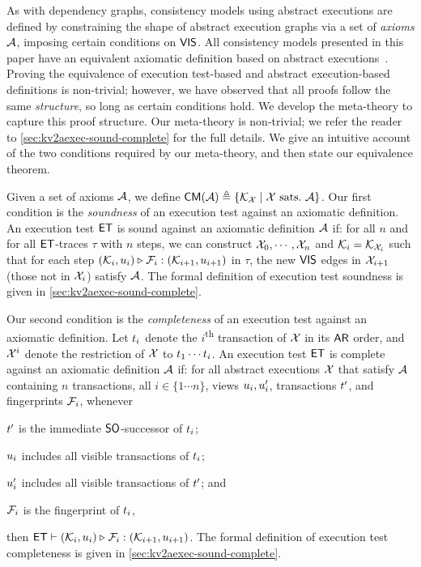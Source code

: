 As with dependency graphs, consistency models using abstract executions are defined by constraining the shape of abstract execution graphs via a set of \emph{axioms} $\mathcal{A}$, \eg imposing certain conditions on $\mathsf{VIS}$. %
All consistency models presented in this paper have an equivalent axiomatic definition based on abstract executions~\cite{framework-concur,laws}. 
Proving the equivalence of execution test-based and abstract execution-based definitions is non-trivial; 
however, we have observed that all proofs follow the same \emph{structure}, so long as certain conditions hold. 
We develop the meta-theory to capture this proof structure.
Our meta-theory is non-trivial; we refer the reader to \cref{sec:kv2aexec-sound-complete} for the full details. 
We give an intuitive account of the two conditions required by our meta-theory, and then state our equivalence theorem. 

Given a set of axioms $\mathcal{A}$, we define $\mathsf{CM}(\mathcal{A}) \triangleq \{\mathcal{K}_{\mathcal{X}} \mid \mathcal{X} \text{ sats.\ } \mathcal{A} \}$.
Our first condition is the \emph{soundness} of an execution test against an axiomatic definition.
An execution test $\mathsf{ET}$ is sound against an axiomatic definition $\mathcal{A}$ if:
for all $n$ and for all \( \mathsf{ET} \)-traces \( \tau \) with \( n \) steps, 
we can construct $\mathcal{X}_0, \cdots, \mathcal{X}_n$ and \( \mathcal{K}_i = \mathcal{K}_{\mathcal{X}_i} \) such that 
for each step \( (\mathcal{K}_i, u_i) \triangleright_{} \mathcal{F}_i : (\mathcal{K}_{i+1}, u_{i+1}) \) in \( \tau \),
the new $\mathsf{VIS}$ edges in \( \mathcal{X}_{i+1} \) (those not in $\mathcal{X}_i$)
satisfy \( \mathcal{A} \).
The formal definition of execution test soundness is given in \cref{sec:kv2aexec-sound-complete}.
%

Our second condition is the \emph{completeness} of an execution test against an axiomatic definition.
Let $t_i$ denote the $i$\textsuperscript{th} transaction of $\mathcal{X}$ in its $\mathsf{AR}$ order, and $\mathcal{X}^{i}$ denote the restriction of $\mathcal{X}$ to $t_1 \cdots t_i$. 
An execution test $\mathsf{ET}$ is complete against an axiomatic definition $\mathcal{A}$ if:
for all abstract executions \( \mathcal{X} \) that satisfy \( \mathcal{A} \) containing $n$ transactions, 
all $i \in \{1 \cdots n\}$, views $u_i, u'_i$, transactions $t'$, and fingerprints $\mathcal{F}_i$,
whenever
\begin{enumerate*}
	\item $t'$ is the immediate $\mathsf{SO}$-successor of $t_i$;
	\item \( u_i \) includes all visible transactions of \( t_i \); 
	\item $u'_i$ includes all visible transactions of $t'$; and
	\item $\mathcal{F}_i$ is the fingerprint of $t_i$, 
\end{enumerate*} 
then $\mathsf{ET} \vdash (\mathcal{K}_i, u_i) \triangleright_{} \mathcal{F}_i : (\mathcal{K}_{i+1}, u_{i+1})$.
The formal definition of execution test completeness is given in \cref{sec:kv2aexec-sound-complete}.
%

